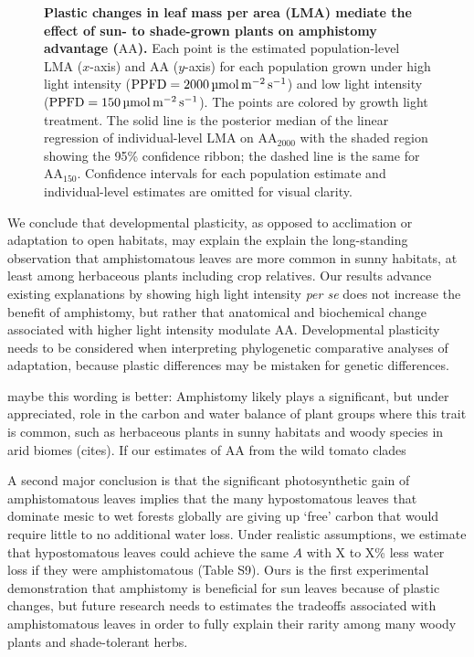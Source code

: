 \documentclass[
  letterpaper,
  DIV=11,
  numbers=noendperiod]{scrartcl}
\newcommand{\aahigh}{\mathrm{AA}_{2000}}
\newcommand{\aalow}{\mathrm{AA}_{150}}
\newcommand{\aax}{$\mathrm{AA}$}
\newcommand{\ppfdequals}[1]{$\mathrm{PPFD} = \qty{#1}{\micro\mol\raiseto{-2}\meter\raiseto{-1}\second}$}
\begin{document}
\begin{figure}


\caption{\label{fig-lma_aa}\textbf{Plastic changes in leaf mass per area (LMA) mediate the effect of sun- to shade-grown plants on amphistomy advantage (\aax{}).}
Each point is the estimated population-level LMA (\(x\)-axis) and \aax{}
(\(y\)-axis) for each population grown under high light intensity
(\ppfdequals{2000}) and low light intensity (\ppfdequals{150}). The
points are colored by growth light treatment. The solid line is the
posterior median of the linear regression of individual-level LMA on
\(\aahigh\) with the shaded region showing the 95\% confidence ribbon;
the dashed line is the same for \(\aalow\). Confidence intervals for
each population estimate and individual-level estimates are omitted for
visual clarity.}

\end{figure}%

We conclude that developmental plasticity, as opposed to acclimation or
adaptation to open habitats, may explain the explain the long-standing
observation that amphistomatous leaves are more common in sunny
habitats, at least among herbaceous plants including crop relatives. Our
results advance existing explanations by showing high light intensity
\emph{per se} does not increase the benefit of amphistomy, but rather
that anatomical and biochemical change associated with higher light
intensity modulate \aax{}. Developmental plasticity needs to be
considered when interpreting phylogenetic comparative analyses of
adaptation, because plastic differences may be mistaken for genetic
differences.

maybe this wording is better: Amphistomy likely plays a significant, but
under appreciated, role in the carbon and water balance of plant groups
where this trait is common, such as herbaceous plants in sunny habitats
and woody species in arid biomes (cites). If our estimates of AA from
the wild tomato clades

A second major conclusion is that the significant photosynthetic gain of
amphistomatous leaves implies that the many hypostomatous leaves that
dominate mesic to wet forests globally are giving up `free' carbon that
would require little to no additional water loss. Under realistic
assumptions, we estimate that hypostomatous leaves could achieve the
same \(A\) with X to X\% less water loss if they were amphistomatous
(Table S9). Ours is the first experimental demonstration that amphistomy
is beneficial for sun leaves because of plastic changes, but future
research needs to estimates the tradeoffs associated with amphistomatous
leaves in order to fully explain their rarity among many woody plants
and shade-tolerant herbs.
\end{document}
